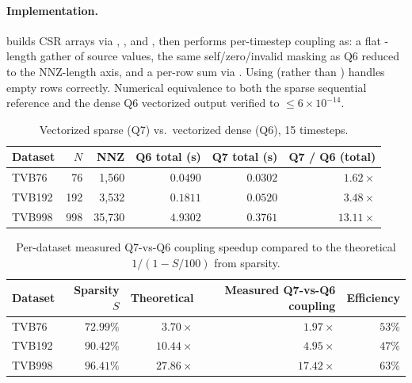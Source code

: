 \documentclass[11pt, a4paper]{article}
\begin{document}
\paragraph{Implementation.}
 builds CSR arrays via
, , and , then performs
per-timestep coupling as: a flat -length gather of source
values, the same self/zero/invalid masking as Q6 reduced to the
NNZ-length axis, and a per-row sum via
. Using
 (rather than ) handles empty
rows correctly. Numerical equivalence to both the sparse sequential
reference and the dense Q6 vectorized output verified to
$\leq 6 \times 10^{-14}$.

\begin{table}[H]
    \centering
    \caption{Vectorized sparse (Q7) vs.\ vectorized dense (Q6), 15 timesteps.}
    \label{tab:q7-speedup}
    \footnotesize
    \begin{tabular}{lrrrrr}
        \toprule
        Dataset & $N$ & NNZ & Q6 total (s) & Q7 total (s) & Q7 / Q6 (total) \\
        \midrule
        TVB76   &  76 &  1{,}560 & $0.0490$ & $0.0302$ & $1.62\times$ \\
        TVB192  & 192 &  3{,}532 & $0.1811$ & $0.0520$ & $3.48\times$ \\
        TVB998  & 998 & 35{,}730 & $4.9302$ & $0.3761$ & $\mathbf{13.11\times}$ \\
        \bottomrule
    \end{tabular}
\end{table}

\begin{table}[H]
    \centering
    \caption{Per-dataset measured Q7-vs-Q6 coupling speedup compared to the theoretical $1/(1{-}S/100)$ from sparsity.}
    \label{tab:q7-vs-theory}
    \begin{tabular}{lrrrr}
        \toprule
        Dataset & Sparsity $S$ & Theoretical & Measured Q7-vs-Q6 coupling & Efficiency \\
        \midrule
        TVB76  & $72.99\%$ &  $3.70\times$ &  $1.97\times$ & $53\%$ \\
        TVB192 & $90.42\%$ & $10.44\times$ &  $4.95\times$ & $47\%$ \\
        TVB998 & $96.41\%$ & $27.86\times$ & $17.42\times$ & $63\%$ \\
        \bottomrule
    \end{tabular}
\end{table}
\end{document}
